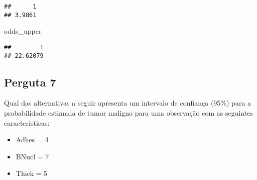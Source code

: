 \documentclass[
]{article}
\newenvironment{Shaded}{\begin{snugshade}}{\end{snugshade}}
\newcommand{\NormalTok}[1]{#1}
\providecommand{\tightlist}{%
  \setlength{\itemsep}{0pt}\setlength{\parskip}{0pt}}
\begin{document}
\begin{verbatim}
##      1 
## 3.9861
\end{verbatim}

\begin{Shaded}
\begin{Highlighting}[]
\NormalTok{odds\_upper}
\end{Highlighting}
\end{Shaded}

\begin{verbatim}
##        1 
## 22.62079
\end{verbatim}

\subsection{Perguta 7}\label{perguta-7}

Qual das alternativas a seguir apresenta um intervalo de confiança
(95\%) para a probabilidade estimada de tumor maligno para uma
observação com as seguintes características:

\begin{itemize}
\tightlist
\item
  Adhes = 4
\item
  BNucl = 7
\item
  Thick = 5
\end{itemize}
\end{document}
